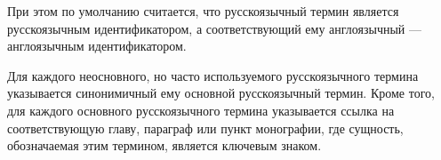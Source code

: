 \begin{partbacktext}
При этом по умолчанию считается, что русскоязычный термин является  русскоязычным идентификатором, а соответствующий ему англоязычный ---  англоязычным идентификатором.

\begin{comment}
\begin{SCn}
	\scnheader{sc-идентификатор}
	\scntext{часто используемый sc-идентификатор}{внешний идентификатор sc-элемента}
	\scnidtf{строка символов или пиктограмма, взаимно однозначно представляющая соответствующий sc-элемент, хранимый в sc-памяти}
	\begin{scnsubdividing}
		\scnitem{основной sc-идентификатор}
		\scnitem{неосновной sc-идентификатор}
		\begin{scnindent}
			\scnsuperset{часто используемый неосновной sc-идентификатор}
		\end{scnindent} 
	\end{scnsubdividing}

	\begin{scnsubdividing}
		\scnitem{русскоязычный sc-идентификатор}
		\scnitem{англоязычный sc-идентификатор}
		\scnitem{интернациональный sc-идентификатор}
	\end{scnsubdividing}
\end{SCn}

\end{comment}

Для каждого неосновного, но часто используемого русскоязычного термина указывается синонимичный ему основной русскоязычный термин. Кроме того, для каждого основного русскоязычного термина указывается ссылка на соответствующую главу, параграф или пункт монографии, где сущность, обозначаемая этим термином, является ключевым знаком.

\end{partbacktext}

